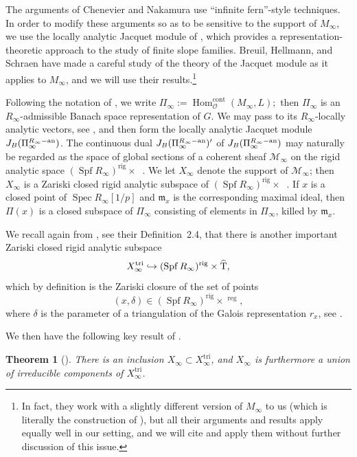 \documentclass[11pt]{article}
\let\mathcal\mathscr
\newcommand\hto{\mathrel{\lhook\joinrel\to}}
\newtheorem{thm}[prop]{Theorem}
\theoremstyle{definition}
\DeclareMathOperator{\Spf}{Spf}
\DeclareMathOperator{\That}{\widehat{T}}
\DeclareMathOperator{\Hom}{Hom}
\DeclareMathOperator{\Spec}{Spec}
\newcommand{\mm}{\mathfrak m}
\newcommand{\cM}{\mathcal{M}}
\newcommand{\cO}{\mathcal{O}}
\newcommand{\ana}{\mathrm{an}}
\newcommand{\cont}{\mathrm{cont}}
\newcommand\reg{\mathrm{reg}}
\newcommand\rig{\mathrm{rig}}
\newcommand\tri{\mathrm{tri}}
\begin{document}
The arguments of Chenevier and Nakamura use ``infinite fern''-style
techniques. In order to modify these arguments so as to be sensitive
to the support of $M_{\infty}$, we use the locally analytic Jacquet
module of \cite{Jacquet-one}, which provides a representation-theoretic
approach to the study of finite slope families. Breuil, Hellmann,
and Schraen \cite{BHS} have made a careful study of the theory
of the Jacquet module as it applies to $M_{\infty}$, and we will
use their results.\footnote{In fact, they work with a slightly
different version of $M_{\infty}$ to us (which is literally
the construction of \cite{six-authors}), but all their arguments
and results apply equally well in our setting, and we will cite
and apply them without further discussion of this issue.}

Following the notation of \cite{BHS},
we write $\Pi_{\infty} := \Hom^{\cont}_{\cO}
(M_{\infty}, L);$ then $\Pi_{\infty}$ is an
$R_{\infty}$-admissible Banach space representation of $G$.
We may pass to its $R_{\infty}$-locally analytic vectors, see \cite[\S 3.1]{BHS},
and then form the locally analytic Jacquet module
$J_B(\Pi_{\infty}^{R_{\infty}\textup{-}\ana})$.
The continuous dual
$J_B(\Pi_{\infty}^{R_{\infty}\textup{-}\ana})'$
of $J_B(\Pi_{\infty}^{R_{\infty}\textup{-}\ana})$
may naturally be
regarded as the space of global sections of a coherent sheaf
$\cM_{\infty}$
on the rigid analytic
space $(\Spf R_{\infty})^{\rig} \times \That$.
We let $X_{\infty}$ denote the support of $\cM_{\infty}$;
then $X_{\infty}$ is a
Zariski closed rigid analytic subspace of
$ (\Spf R_{\infty})^{\rig}\times \That$. If $x$ is a closed point of $\Spec R_{\infty}[1/p]$ and
$\mm_x$ is the corresponding maximal ideal,
then $\Pi(x)$ is a closed subspace of $\Pi_{\infty}$ consisting of elements in $\Pi_{\infty}$, killed
by $\mm_x$.

We recall again from \cite{BHS}, see their Definition~2.4,
that there is another important
Zariski closed rigid analytic subspace
\[
X^{\tri}_{\infty} \hto
(\Spf R_{\infty})^{\rig}\times \That,
\]
which by definition is the Zariski closure of the
set of points
\[
(x,\delta) \in
(\Spf R_{\infty})^{\rig}\times \That^{\reg},
\]
where $\delta$ is the parameter of a triangulation of the Galois
representation $r_x$, see \hbox{\cite[\S 2.2]{BHS}}.

We then have the following key result of \cite{BHS}.

\begin{thm}[{\cite[Th.\,3.21]{BHS}}]
\label{thm:BHS main}
There is an inclusion
$X_{\infty} \subset X^{\tri}_{\infty}$,
and $X_{\infty}$ is furthermore a union of irreducible
components of $X^{\tri}_{\infty}$.
\end{thm}
\end{document}
